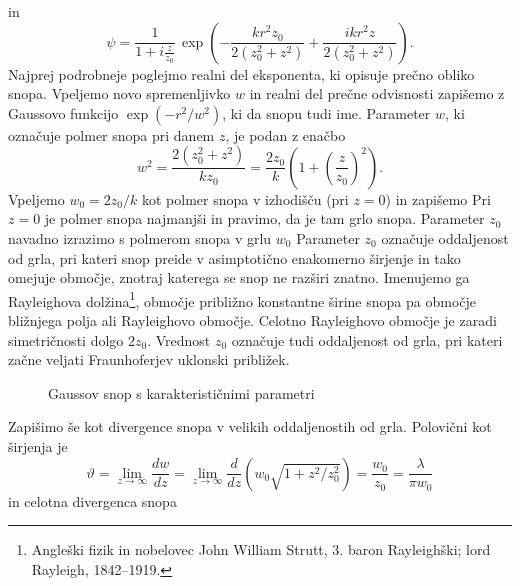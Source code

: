 in
\begin{equation}
 \psi = \frac{1}{1+i\frac{z}{z_{0}}}\,\exp\left(-\frac{kr^{2}z_{0}}{2(z_{0}^{2}+z^{2})}+
 \frac{ikr^{2}z}{2(z_{0}^{2}+z^{2})}\right).
 \label{eq:gaussov-snop-vmesni}
\end{equation}
Najprej podrobneje poglejmo realni del eksponenta, ki opisuje prečno obliko snopa. Vpeljemo novo spremenljivko $w$
in realni del prečne odvisnosti zapišemo z Gaussovo funkcijo $\exp(-r^2/w^2)$, 
ki da snopu tudi ime. Parameter $w$, ki označuje 
polmer snopa pri danem $z$, je podan z enačbo 
\begin{equation}
w^2 = \frac{2(z_0^2+z^2)}{kz_0}= \frac{2z_0}{k}\left(1+\left(\frac{z}{z_0}\right)^2\right).
\end{equation}
Vpeljemo $w_0 = 2z_0/k$ kot polmer snopa v izhodišču (pri $z=0$) in zapišemo
Pri $z=0$ je polmer snopa najmanjši in pravimo, da je tam grlo snopa. Parameter $z_0$ 
navadno izrazimo s polmerom snopa v grlu $w_0$
Parameter $z_{0}$ označuje oddaljenost od grla, 
pri kateri snop preide v asimptotično enakomerno širjenje in tako omejuje območje,
znotraj katerega se snop ne razširi znatno. Imenujemo ga 
Rayleighova dolžina\footnote{Angleški fizik in 
nobelovec John William Strutt, 3. baron Rayleighški; lord Rayleigh, 1842--1919.},
območje približno konstantne širine snopa pa območje bližnjega polja ali Rayleighovo
območje. Celotno Rayleighovo 
območje je zaradi simetričnosti dolgo $2z_0$. 
Vrednost $z_{0}$ označuje tudi oddaljenost od grla, pri kateri začne veljati 
Fraunhoferjev uklonski približek. 
\begin{figure}[h]
\centering
\def\svgwidth{120truemm} 

\caption{Gaussov snop s karakterističnimi parametri}
\label{fig:Gauss}
\end{figure}

Zapišimo še kot divergence snopa v velikih oddaljenostih od grla. Polovični kot širjenja je
\begin{equation}
\vartheta=\lim_{z \to \infty} \frac{dw}{dz} = \lim_{z \to \infty}\frac{d}{dz} \left(w_0\sqrt{1+z^2/z_0^2}\right)=
\frac{w_{0}}{z_{0}}= \frac{\lambda}{\pi w_{0}}\label{eq:divergenca-snopa}
\end{equation}
in celotna divergenca snopa

